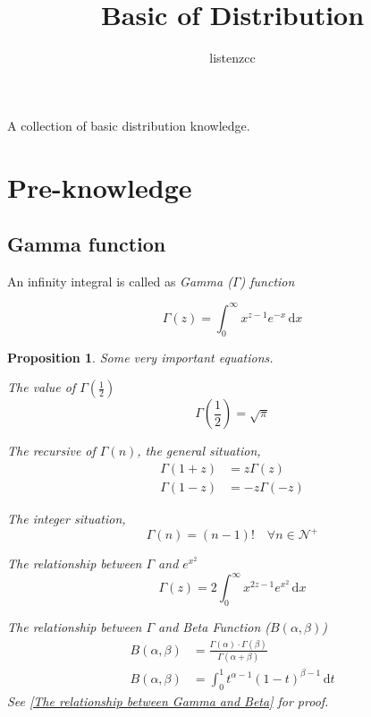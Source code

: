 \documentclass[a4paper]{article}
\title{Basic of Distribution}
\author{listenzcc}
\newtheorem{proposition}{Proposition}[section]
\begin{document}
\maketitle

\abstract
A collection of basic distribution knowledge.

\tableofcontents

\section{Pre-knowledge}

\subsection{Gamma function}

An infinity integral is called as \emph{Gamma ($\Gamma$) function}

\begin{equation}
    \Gamma(z) = \int_{0}^{\infty} x^{z-1} e^{-x} \,\mathrm{d}x
\end{equation}

\begin{proposition} \label{Gamma function propositions}
    Some very important equations.

    The value of $\Gamma(\frac{1}{2})$
    \begin{equation*}
        \Gamma(\frac{1}{2}) = \sqrt {\pi}
    \end{equation*}

    The recursive of $\Gamma(n)$, the general situation,
    \begin{equation*}
        \begin{aligned}
            \Gamma(1+z) & = z \Gamma(z)   \\
            \Gamma(1-z) & = -z \Gamma(-z)
        \end{aligned}
    \end{equation*}

    The integer situation,
    \begin{equation*}
        \Gamma(n) = (n-1)! \quad \forall n \in \mathcal{N}^+
    \end{equation*}

    The relationship between $\Gamma$ and $e^{x^{2}}$
    \begin{equation*}
        \Gamma(z) = 2 \int_{0}^{\infty} x^{2z-1} e^{x^{2}} \,\mathrm{d}x
    \end{equation*}

    The relationship between $\Gamma$ and Beta Function ($B(\alpha, \beta)$)
    \begin{equation*}
        \begin{aligned}
            B(\alpha, \beta) & = \frac{\Gamma(\alpha) \cdot \Gamma(\beta)}{\Gamma(\alpha + \beta)} \\
            B(\alpha, \beta) & = \int_{0}^{1} t^{\alpha-1} (1-t)^{\beta-1} \,\mathrm{d}t
        \end{aligned}
    \end{equation*}
    See \ref{The relationship between Gamma and Beta} for proof.

\end{proposition}
\end{document}
